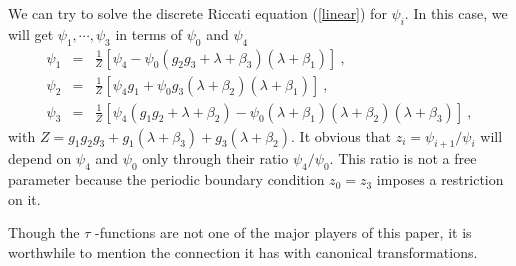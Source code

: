 \documentclass[a4paper,11pt]{article}
\begin{document}
We can try to solve the discrete Riccati equation (\ref{linear}) for
$\psi_i$. In this case, we will get $\psi _1,\cdots, \psi_3$ in terms of
$\psi_0$ and $\psi_4 $
\begin{eqnarray}
\label{psi_3}
\psi_1 \!\!\!&=&\!\!\! \frac{1}{Z}\left[\psi_4 -\psi_0 (g_2g_3+\lambda+\beta_3)(\lambda+\beta_1)\right] ~,\\
\psi_2 \!\!\!&=&\!\!\! \frac{1}{Z}\left[\psi_4 g_1+\psi_0g_3(\lambda+\beta_2)(\lambda +\beta_1)\right] ~,\\
\psi_3 \!\!\!&=&\!\!\! \frac{1}{Z}\left[\psi_4(g_1g_2+\lambda+\beta_2)
   -\psi_0(\lambda+\beta_1)(\lambda+\beta_2)(\lambda+\beta_3)\right] ~,
\end{eqnarray}
with $Z=g_1g_2g_3+g_1(\lambda+\beta_3)+g_3(\lambda+\beta_2)$. It obvious that
$z_i=\psi_{i+1}/\psi_i$ will depend on $\psi _4$ and $\psi_0$ only through their
ratio $\psi_4/\psi_0.$ This ratio is not a free parameter because the periodic
boundary condition $z_0=z_3$ imposes a restriction on it.


Though the $\tau$ -functions are not one of the major players of this paper,
it is worthwhile to mention the connection it has with canonical transformations.
\end{document}
